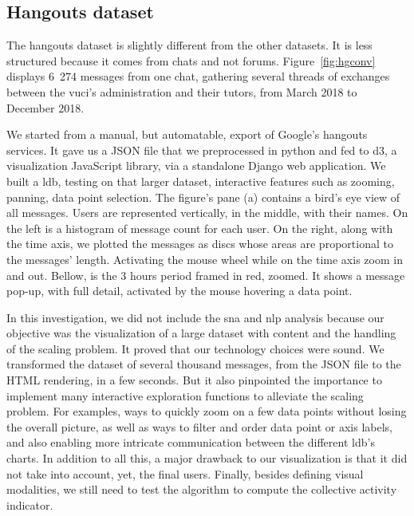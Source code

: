 \documentclass[a4paper,twoside]{article}
\begin{document}
\subsection{Hangouts dataset}

The hangouts dataset is slightly different from the other datasets.  It is less structured because it comes from chats and not forums.  Figure~\ref{fig:hgconv} displays 6~274 messages from one chat, gathering several threads of exchanges between the \gls{vuci}'s administration and their tutors, from March 2018 to December 2018.

We started from a manual, but automatable, export of Google's hangouts services.  It gave us a JSON file that we preprocessed in python and fed to d3, a visualization JavaScript library, via a standalone Django web application.  We built a \gls{ldb}, testing on that larger dataset, interactive features such as zooming, panning, data point selection.
The figure's pane (a) contains a bird's eye view of all messages.  Users are represented vertically, in the middle, with their names.  On the left is a histogram of message count for each user.  On the right, along with the time axis, we plotted the messages as discs whose areas are proportional to the messages' length.  Activating the mouse wheel while on the time axis zoom in and out.  Bellow, is the 3 hours period framed in red, zoomed.  It shows a message pop-up, with full detail, activated by the mouse hovering a data point.  

In this investigation, we did not include the \gls{sna} and \gls{nlp} analysis because our objective was the visualization of a large dataset with content and the handling of the scaling problem.  It proved that our technology choices were sound.  We transformed the dataset of several thousand messages, from the JSON file to the HTML rendering, in a few seconds.
But it also pinpointed the importance to implement many interactive exploration functions to alleviate the scaling problem.  For examples, ways to quickly zoom on a few data points without losing the overall picture, as well as ways to filter and order data point or axis labels, and also enabling more intricate communication between the different \gls{ldb}'s charts.
In addition to all this, a major drawback to our visualization is that it did not take into account, yet, the final users.
Finally, besides defining visual modalities, we still need to test the algorithm to compute the collective activity indicator.
\end{document}
